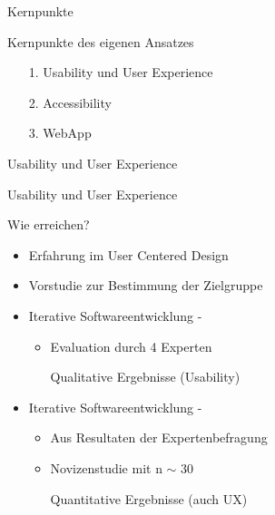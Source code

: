 



\begin{subsection}{Kernpunkte}
\begin{frame}{Kernpunkte des eigenen Ansatzes}

\pause
\begin{itemize}[<+->]
\item[1.]Usability und User Experience\\
\item[2.]Accessibility\\
\item[3.]WebApp \pause {}
\end{itemize}

\end{frame}
\end{subsection} %




\begin{subsection}{Usability und User Experience}
\begin{frame}{Usability und User Experience}

\pause

\begin{question}[Frage]
Wie erreichen?
\end{question}

\pause

\begin{itemize}[<+->]
\item Erfahrung im User Centered Design
\item Vorstudie zur Bestimmung der Zielgruppe
\item Iterative Softwareentwicklung - \pause {}
	\pause
	\begin{itemize}
	\item Evaluation durch 4 Experten
	\item[\strong{$\rightarrow$}]Qualitative Ergebnisse (Usability)
	\end{itemize}
\item Iterative Softwareentwicklung - \pause {}
	\pause
	\begin{itemize}
	\item Aus Resultaten der Expertenbefragung
	\item Novizenstudie mit n $\sim$ 30
	\item[\strong{$\rightarrow$}]Quantitative Ergebnisse (auch UX)
	\end{itemize}
\end{itemize}

\end{frame}
\end{subsection} %


